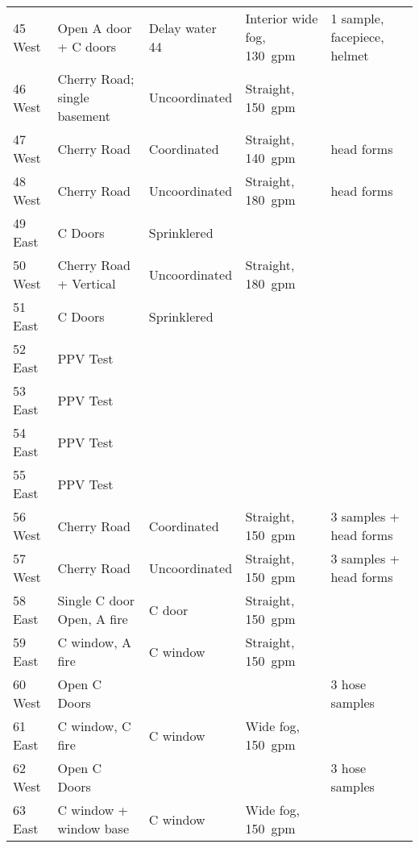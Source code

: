 \documentclass{article}
\begin{document}
\begin{sidewaystable}[htbp]
\begin{tabular}{lllll}
45 West         &  Open A door + C doors        & Delay water 44   &  Interior wide fog, 130~gpm         & 1 sample, facepiece, helmet \\
46 West         &  Cherry Road; single basement & Uncoordinated    &  Straight, 150~gpm					 & \\
47 West         &  Cherry Road					& Coordinated      &  Straight, 140~gpm					 & head forms \\
48 West         &  Cherry Road					& Uncoordinated    &  Straight, 180~gpm                  & head forms \\
49 East         &  C Doors                      & Sprinklered      & & \\
50 West         &  Cherry Road + Vertical		& Uncoordinated    &  Straight, 180~gpm                  & \\
51 East         &  C Doors                      & Sprinklered      & & \\
52 East			&  PPV Test 					& & &			\\
53 East			&  PPV Test 					& & &			\\
54 East			&  PPV Test 					& & &			\\
55 East			&  PPV Test 					& & &			\\
56 West			&  Cherry Road					& Coordinated	   &  Straight, 150~gpm					 & 3 samples + head forms \\ 
57 West			&  Cherry Road					& Uncoordinated	   &  Straight, 150~gpm					 & 3 samples + head forms \\
58 East			&  Single C door Open, A fire 	& C door    	   &  Straight, 150~gpm                  & \\
59 East         &  C window, A fire				& C window  	   &  Straight, 150~gpm					 & \\
60 West			&  Open C Doors 				& 				   &									 & 3 hose samples \\
61 East         &  C window, C fire             & C window         &  Wide fog, 150~gpm                  & \\
62 West			&  Open C Doors 				& 				   &									 & 3 hose samples \\
63 East         &  C window + window base       & C window         & Wide fog, 150~gpm 					 & \\


\bottomrule[1.25pt]
\end{tabular}
\end{sidewaystable}
\end{document}
